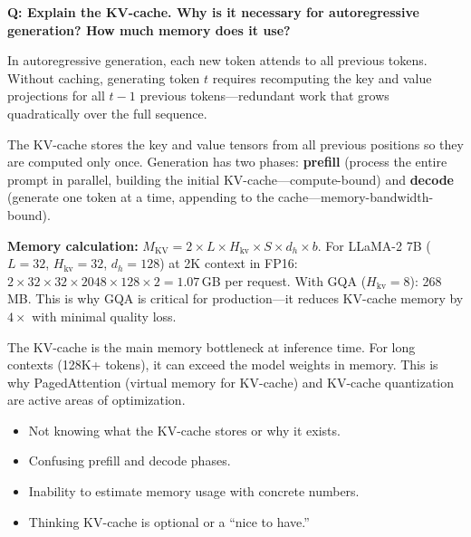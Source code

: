 \begin{interviewq}
\textbf{Q: Explain the KV-cache.  Why is it necessary for autoregressive generation?
How much memory does it use?}

 \quad {} \quad \badgefreq{\freqhigh}

\stronganswer
In autoregressive generation, each new token attends to all previous tokens.  Without
caching, generating token $t$ requires recomputing the key and value projections for
all $t-1$ previous tokens---redundant work that grows quadratically over the full
sequence.

The KV-cache stores the key and value tensors from all previous positions so they are
computed only once.  Generation has two phases: \textbf{prefill} (process the entire
prompt in parallel, building the initial KV-cache---compute-bound) and \textbf{decode}
(generate one token at a time, appending to the cache---memory-bandwidth-bound).

\textbf{Memory calculation:}
$M_{\text{KV}} = 2 \times L \times H_{\text{kv}} \times S \times d_h \times b$.
For LLaMA-2 7B ($L{=}32$, $H_{\text{kv}}{=}32$, $d_h{=}128$) at 2K context in FP16:
$2 \times 32 \times 32 \times 2048 \times 128 \times 2 = 1.07$\,GB per request.  With
GQA ($H_{\text{kv}}{=}8$): 268\,MB.  This is why GQA is critical for production---it
reduces KV-cache memory by $4\times$ with minimal quality loss.

The KV-cache is the main memory bottleneck at inference time.  For long contexts (128K+
tokens), it can exceed the model weights in memory.  This is why PagedAttention (virtual
memory for KV-cache) and KV-cache quantization are active areas of optimization.

\redflags
\begin{itemize}
    \item Not knowing what the KV-cache stores or why it exists.
    \item Confusing prefill and decode phases.
    \item Inability to estimate memory usage with concrete numbers.
    \item Thinking KV-cache is optional or a ``nice to have.''
\end{itemize}



\end{interviewq}
